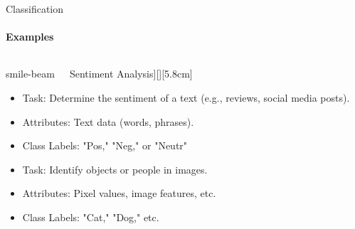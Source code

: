 \documentclass[aspectratio=169]{beamer}
\begin{document}
\begin{frame}{Classification}
    \framesubtitle{Examples}

    \vspace{-0.8cm}
    \begin{columns}
        \begin{column}{0.32\textwidth}
        
            \begin{coloredblock}[yellow][\centering\faIcon[regular]{smile-beam}~~~Sentiment Analysis][\footnotesize][5.8cm]
                \begin{itemize}
                    \item \scriptsize Task: Determine the sentiment of a text (e.g., reviews, social media posts).
                    \item \scriptsize Attributes: Text data (words, phrases).
                    \item \scriptsize Class Labels: "Pos," "Neg," or "Neutr"
                \end{itemize}
            \end{coloredblock}
            \vspace{0.3cm}
            \begin{coloredblock}
                    \begin{itemize}
                        \item \scriptsize Task: Identify objects or people in images.
                        \item \scriptsize Attributes: Pixel values, image features, etc.
                        \item \scriptsize Class Labels: "Cat," "Dog," etc.
                    \end{itemize}
            \end{coloredblock}
            

\end{column}
\end{columns}
\end{frame}
\end{document}
